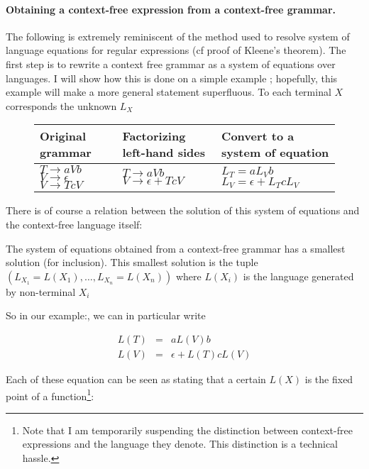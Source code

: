 \paragraph*{Obtaining a context-free expression from a context-free grammar.} The following is extremely reminiscent of the method used to resolve system of language equations for regular expressions (cf proof of Kleene's theorem). The first step is to rewrite a context free grammar as a system of equations over languages. I will show how this is done on a simple example ; hopefully, this example will make a more general statement superfluous. To each terminal $X$ corresponds the unknown $L_X$

\begin{figure}
\begin{tabularx}{\textwidth}{X  X  X}
Original grammar & Factorizing left-hand sides & Convert to a system of equation\\
\midrule
$T \rightarrow aVb$\newline
$V \rightarrow \epsilon$ \newline
$V \rightarrow T c V$
&
$T \rightarrow aVb$\newline
$V \rightarrow \epsilon + T c V$
&
$L_T = aL_Vb$\newline
$L_V = \epsilon + L_T c L_V$
\end{tabularx}
\end{figure}
%
There is of course a relation between the solution of this system of equations and the context-free language itself:

\begin{prop}\label{prop:sys_eqn}
The system of equations obtained from a context-free grammar has a smallest solution (for inclusion). This smallest solution is the tuple $(L_{X_1} = L(X_1),\ldots, L_{X_n}= L(X_n))$ where $L(X_i)$ is the language generated by non-terminal $X_i$ 
\end{prop}
%
So in our example:, we can in particular write

$$
\begin{array}{lcl}
L(T) &=& aL(V)b\\
L(V) &=& \epsilon + L(T) c L(V)
\end{array}
$$

Each of these equation can be seen as stating that a certain $L(X)$ is the fixed point of a function\footnote{Note that I am temporarily suspending the distinction between context-free expressions and the language they denote. This distinction is a technical hassle.}:

